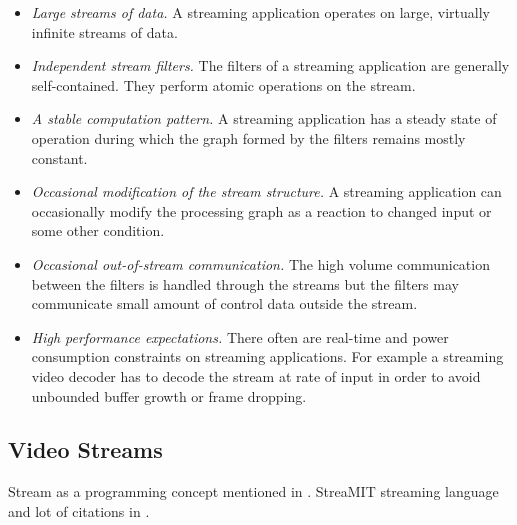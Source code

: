 \begin{itemize}
    \item \textit{Large streams of data.} A streaming application operates on large, virtually infinite streams of data.
    \item \textit{Independent stream filters.} The filters of a streaming application are generally self-contained. They perform atomic operations on the stream.
    \item \textit{A stable computation pattern.} A streaming application has a steady state of operation during which the graph formed by the filters remains mostly constant.
    \item \textit{Occasional modification of the stream structure.} A streaming application can occasionally modify the processing graph as a reaction to changed input or some other condition.
    \item \textit{Occasional out-of-stream communication.} The high volume communication between the filters is handled through the streams but the filters may communicate small amount of control data outside the stream.
    \item \textit{High performance expectations.} There often are real-time and power consumption constraints on streaming applications. For example a streaming video decoder has to decode the stream at rate of input in order to avoid unbounded buffer growth or frame dropping.
\end{itemize}

\subsection{Video Streams}

Stream as a programming concept mentioned in \cite{abelson1983structure}.
StreaMIT streaming language and lot of citations in \cite{thies2002streamit}.
